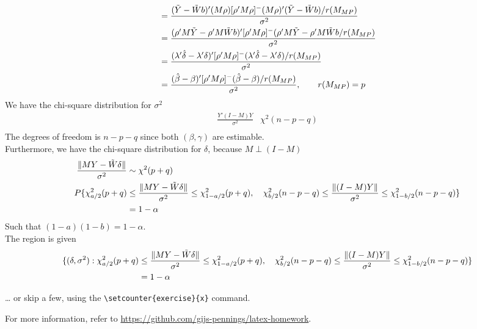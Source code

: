 \documentclass{article}
\begin{document}
\begin{itemize}
\begin{align*}
 &= \frac{(\Tilde{Y}- \Tilde{W} b)' (M\rho) [\rho' M \rho]^{-} (M\rho)' (\Tilde{Y}- \Tilde{W} b)/r(M_{MP})}{\sigma^2} \\
 &= \frac{( \rho'M \Tilde{Y}- \rho'M \Tilde{W} b)'  [\rho' M \rho]^{-} ( \rho'M \Tilde{Y}-  \rho'M \Tilde{W} b/r(M_{MP})}{\sigma^2} \\
&=  \frac{(\lambda' \hat{\delta} - \lambda' \delta)'  [\rho' M \rho]^{-} (\lambda' \hat{\delta} - \lambda' \delta)/r(M_{MP})}{\sigma^2} \\
&=  \frac{(\hat{\beta} - \beta)'  [\rho' M \rho]^{-} (\hat{\beta} - \beta)/r(M_{MP})}{\sigma^2}, \qquad r(M_{MP}) = p
\end{align*}
We have the chi-square distribution for $\sigma^2$ 
\begin{align*}
\frac{Y'(I-M) Y}{\sigma^2} & \chi^2(n-p-q) \\
\end{align*}
The degrees of freedom is $n-p-q$ since both $(\beta, \gamma)$ are estimable. \\
Furthermore, we have the chi-square distribution for $\delta$, because $M \perp (I-M)$
\begin{align*}
\frac{ \lVert M Y - \Tilde{W} \delta \rVert}{\sigma^2} & \sim \chi^2(p+q) \\
P\{ \chi^2_{a/2}{(p+q)} &\leq \frac{\lVert MY - \Tilde{W} \delta  \rVert}{\sigma^2} \leq \chi^2_{1-a/2}{(p+q)}, \quad
\chi^2_{b/2}{(n-p-q)} \leq \frac{\lVert (I-M) Y \rVert}{\sigma^2} \leq \chi^2_{1-b/2}{(n-p-q)} \}\\
&= 1- \alpha
\end{align*}
Such that $(1-a)(1-b) = 1-\alpha$. \\
The region is given
\begin{align*}
\{(\delta, \sigma^2): \chi^2_{a/2}{(p+q)} &\leq \frac{\lVert MY -\Tilde{W} \delta \rVert}{\sigma^2} \leq \chi^2_{1-a/2}{(p+q)}, \quad
\chi^2_{b/2}{(n-p-q)} \leq \frac{\lVert (I-M) Y \rVert}{\sigma^2} \leq \chi^2_{1-b/2}{(n-p-q)} \}\\
&= 1- \alpha
\end{align*}
\end{itemize}



\setcounter{exercise}{7}
\exercise*
\dots{} or skip a few, using the \verb|\setcounter{exercise}{x}| command.

For more information, refer to \url{https://github.com/gijs-pennings/latex-homework}.
\end{document}
